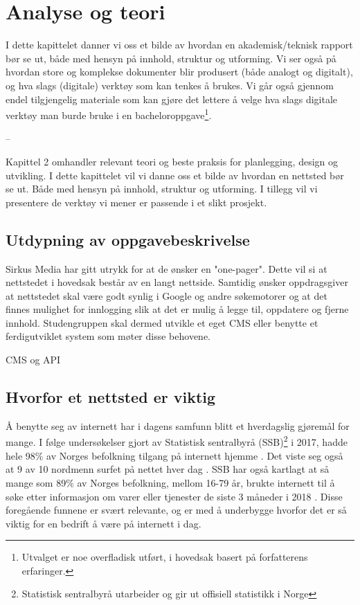 \cleardoublepage
\chapter{Analyse og teori}
\label{chap:analysis}

I dette kapittelet danner vi oss et bilde av hvordan en akademisk/teknisk rapport bør se ut, både med hensyn på innhold, struktur og utforming. Vi ser også på hvordan store og komplekse dokumenter blir produsert (både analogt og digitalt), og hva slags (digitale) verktøy som kan tenkes å brukes. Vi går også gjennom endel tilgjengelig materiale som kan gjøre det lettere å velge hva slags digitale verktøy man burde bruke i en bacheloroppgave\footnote{Utvalget er noe overfladisk utført, i hovedsak basert på forfatterens erfaringer.}.

-- 

Kapittel 2 omhandler relevant teori og beste praksis for planlegging, design og utvikling. I dette kapittelet vil vi danne oss et bilde av hvordan en nettsted bør se ut. Både med hensyn på innhold, struktur og utforming. I tillegg vil vi presentere de verktøy vi mener er passende i et slikt prosjekt.

\section{Utdypning av oppgavebeskrivelse}
Sirkus Media har gitt utrykk for at de ønsker en "one-pager". Dette vil si at nettstedet i hovedsak består av en langt nettside. Samtidig ønsker oppdragsgiver at nettstedet skal være godt synlig i Google og andre søkemotorer og at det finnes mulighet for innlogging slik at det er mulig å legge til, oppdatere og fjerne innhold. Studengruppen skal dermed utvikle et eget CMS eller benytte et ferdigutviklet system som møter disse behovene. 

CMS og API

\section{Hvorfor et nettsted er viktig}
Å benytte seg av internett har i dagens samfunn blitt et hverdagslig gjøremål for mange. I følge undersøkelser gjort av Statistisk sentralbyrå (SSB)\footnote{Statistisk sentralbyrå utarbeider og gir ut offisiell statistikk i Norge} i 2017, hadde hele 98\% av Norges befolkning tilgang på internett hjemme \cite{ssb17fim}. Det viste seg også at 9 av 10 nordmenn surfet på nettet hver dag \cite{ssb17nat}. SSB har også kartlagt  at så mange som 89\% av Norges befolkning, mellom 16-79 år, brukte internett til å søke etter informasjon om varer eller tjenester de siste 3 måneder i 2018 \cite{ssb18aup}. Disse foregående funnene er svært relevante, og er med å underbygge hvorfor det er så viktig for en bedrift å være på internett i dag.

